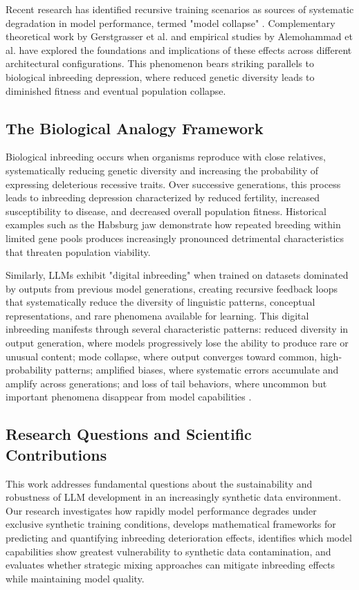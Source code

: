 \documentclass{article}
\begin{document}
Recent research has identified recursive training scenarios as sources of systematic degradation in model performance, termed "model collapse" \cite{shumailov2023curse}. Complementary theoretical work by Gerstgrasser et al. \cite{gerstgrasser2024model} and empirical studies by Alemohammad et al. \cite{alemohammad2023self} have explored the foundations and implications of these effects across different architectural configurations. This phenomenon bears striking parallels to biological inbreeding depression, where reduced genetic diversity leads to diminished fitness and eventual population collapse.

\subsection{The Biological Analogy Framework}

Biological inbreeding occurs when organisms reproduce with close relatives, systematically reducing genetic diversity and increasing the probability of expressing deleterious recessive traits. Over successive generations, this process leads to inbreeding depression characterized by reduced fertility, increased susceptibility to disease, and decreased overall population fitness. Historical examples such as the Habsburg jaw demonstrate how repeated breeding within limited gene pools produces increasingly pronounced detrimental characteristics that threaten population viability.

Similarly, LLMs exhibit "digital inbreeding" when trained on datasets dominated by outputs from previous model generations, creating recursive feedback loops that systematically reduce the diversity of linguistic patterns, conceptual representations, and rare phenomena available for learning. This digital inbreeding manifests through several characteristic patterns: reduced diversity in output generation, where models progressively lose the ability to produce rare or unusual content; mode collapse, where output converges toward common, high-probability patterns; amplified biases, where systematic errors accumulate and amplify across generations; and loss of tail behaviors, where uncommon but important phenomena disappear from model capabilities \cite{seddik2024bad}.

\subsection{Research Questions and Scientific Contributions}

This work addresses fundamental questions about the sustainability and robustness of LLM development in an increasingly synthetic data environment. Our research investigates how rapidly model performance degrades under exclusive synthetic training conditions, develops mathematical frameworks for predicting and quantifying inbreeding deterioration effects, identifies which model capabilities show greatest vulnerability to synthetic data contamination, and evaluates whether strategic mixing approaches can mitigate inbreeding effects while maintaining model quality.
\end{document}
